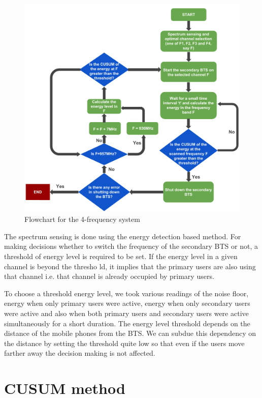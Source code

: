 \begin{figure}
\centering
\includegraphics[width=1\textwidth]{../images/freqSys4}
\caption[4-frequency system]{Flowchart for  the 4-frequency system}
\label{freqSys4}
\end{figure}

The spectrum sensing is done using the energy detection based method. For 
making decisions whether to switch the frequency of the secondary BTS or not, 
a threshold of energy level is required to be set. If the energy level in a 
given channel is beyond the thresho ld, it implies that the primary users are
also using that channel i.e. that channel is already occupied by primary 
users.

To choose a threshold energy level, we took various readings of the noise 
floor, energy when only primary users were active, energy when only secondary 
users were active and also when both primary users and secondary users were 
active simultaneously for a short duration. The energy level threshold depends
on the distance of the mobile phones from the BTS. We can subdue this 
dependency on the distance by setting the threshold quite low so that even if
the users move farther away the decision making is not affected.

\section{CUSUM method}

